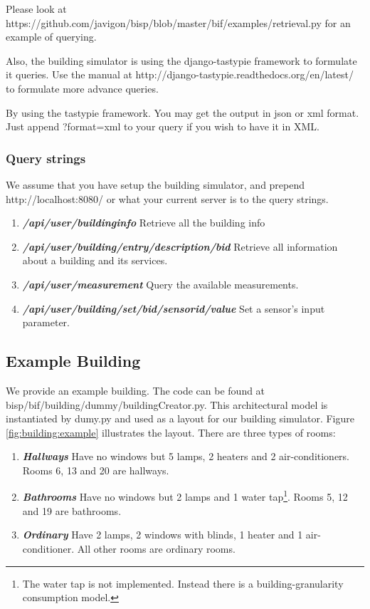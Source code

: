 \documentclass[10pt]{article}
\newcommand{\textdesc}[1]{\textit{\textbf{#1}}} %
\newcommand{\descitem}[1]{\item \textdesc{#1}}
\begin{document}
Please look at https://github.com/javigon/bisp/blob/master/bif/examples/retrieval.py for an example
of querying.

Also, the building simulator is using the django-tastypie framework to formulate it queries. Use the
manual at http://django-tastypie.readthedocs.org/en/latest/ to formulate more advance queries.

By using the tastypie framework. You may get the output in json or xml format. Just append
?format=xml to your query if you wish to have it in XML.

\subsubsection{Query strings}

We assume that you have setup the building simulator, and prepend http://localhost:8080/ or what your current server is to the query strings.

\begin{enumerate}
				\descitem{/api/user/buildinginfo} Retrieve all the building info
				\descitem{/api/user/building/entry/description/bid} Retrieve all information about a
				building and its services.
				\descitem{/api/user/measurement} Query the available measurements.
				\descitem{/api/user/building/set/bid/sensorid/value} Set a sensor's input parameter.
\end{enumerate}

\subsection{Example Building}
\label{sec:interface:high:examplebuilding}

We provide an example building. The code can be found at bisp/bif/building/dummy/buildingCreator.py. This architectural model is instantiated by dumy.py and used as a layout for our building simulator. Figure \ref{fig:building:example} illustrates the layout. There are three types of rooms:
\begin{enumerate}
  \descitem{Hallways} Have no windows but 5 lamps, 2 heaters and 2 air-conditioners. Rooms 6, 13 and 20 are hallways.
  \descitem{Bathrooms} Have no windows but 2 lamps and 1 water tap\footnote{The water tap is not implemented. Instead there is a building-granularity consumption model.}. Rooms 5, 12 and 19 are bathrooms.
  \descitem{Ordinary} Have 2 lamps, 2 windows with blinds, 1 heater and 1 air-conditioner. All other rooms are ordinary rooms.
\end{enumerate}
\end{document}
